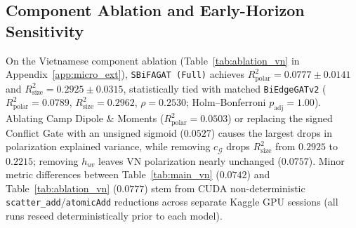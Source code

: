 \documentclass[conference]{IEEEtran}
\begin{document}
\subsection{Component Ablation and Early-Horizon Sensitivity}
On the Vietnamese component ablation (Table~\ref{tab:ablation_vn} in Appendix~\ref{app:micro_ext}), \texttt{SBiFAGAT (Full)} achieves $R^2_{\text{polar}} = 0.0777 \pm 0.0141$ and $R^2_{\text{size}} = 0.2925 \pm 0.0315$, statistically tied with matched \texttt{BiEdgeGATv2} ($R^2_{\text{polar}} = 0.0789$, $R^2_{\text{size}} = 0.2962$, $\rho = 0.2530$; Holm--Bonferroni $p_{\text{adj}} = 1.00$). Ablating Camp Dipole \& Moments ($R^2_{\text{polar}} = 0.0503$) or replacing the signed Conflict Gate with an unsigned sigmoid ($0.0527$) causes the largest drops in polarization explained variance, while removing $c_{\mathcal{G}}$ drops $R^2_{\text{size}}$ from $0.2925$ to $0.2215$; removing $h_{uv}$ leaves VN polarization nearly unchanged ($0.0757$). Minor metric differences between Table~\ref{tab:main_vn} ($0.0742$) and Table~\ref{tab:ablation_vn} ($0.0777$) stem from CUDA non-deterministic \texttt{scatter\_add}/\texttt{atomicAdd} reductions across separate Kaggle GPU sessions (all runs reseed deterministically prior to each model).
\end{document}
